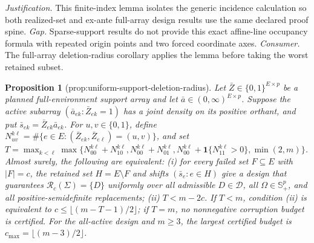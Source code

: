\documentclass{article}
\newtheorem{proposition}{Proposition}
\begin{document}
\par\smallskip\noindent \textit{Justification.} This finite-index lemma isolates the generic incidence calculation so both realized-set and ex-ante full-array design results use the same declared proof spine. \textit{Gap.} Sparse-support results do not provide this exact affine-line occupancy formula with repeated origin points and two forced coordinate axes. \textit{Consumer.} The full-array deletion-radius corollary applies the lemma before taking the worst retained subset.

\begin{proposition}[prop:uniform-support-deletion-radius]\label{prop:uniform-support-deletion-radius}
Let \(\bar Z\in\{0,1\}^{E\times p}\) be a planned full-environment support array and let \(\bar a\in(0,\infty)^{E\times p}\). Suppose the active subarray \((\bar a_{ek}:\bar Z_{ek}=1)\) has a joint density on its positive orthant, and put \(\bar s_{ek}=\bar Z_{ek}\bar a_{ek}\). For \(u,v\in\{0,1\}\), define \(N_{uv}^{k\ell}=\#\{e\in E:(\bar Z_{ek},\bar Z_{e\ell})=(u,v)\}\), and set \(T=\max_{k<\ell}\max\{N_{00}^{k\ell}+N_{10}^{k\ell},N_{00}^{k\ell}+N_{01}^{k\ell},N_{00}^{k\ell}+\mathbf 1\{N_{11}^{k\ell}>0\},\min(2,m)\}\). Almost surely, the following are equivalent: (i) for every failed set \(F\subseteq E\) with \(|F|=c\), the retained set \(H=E\setminus F\) and shifts \((\bar s_e:e\in H)\) give a design that guarantees \(\mathcal R_c(\Sigma)=\{D\}\) uniformly over all admissible \(D\in\mathcal D\), all \(\Omega\in\mathbb S_+^p\), and all positive-semidefinite replacements; (ii) \(T<m-2c\). If \(T<m\), condition (ii) is equivalent to \(c\le\lfloor(m-T-1)/2\rfloor\); if \(T=m\), no nonnegative corruption budget is certified. For the all-active design and \(m\ge3\), the largest certified budget is \(c_{\max}=\lfloor(m-3)/2\rfloor\).
\end{proposition}
\end{document}
